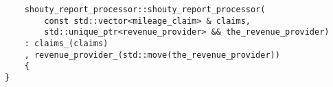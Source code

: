 \begin{verbatim}
    shouty_report_processor::shouty_report_processor(
        const std::vector<mileage_claim> & claims,
        std::unique_ptr<revenue_provider> && the_revenue_provider)
    : claims_(claims)
    , revenue_provider_(std::move(the_revenue_provider))
    {
}
\end{verbatim}